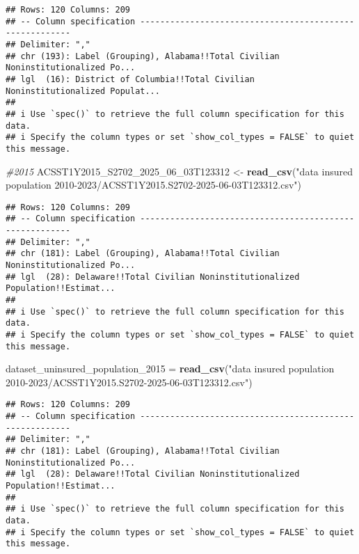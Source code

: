 \documentclass[
]{article}
\newenvironment{Shaded}{\begin{snugshade}}{\end{snugshade}}
\newcommand{\CommentTok}[1]{\textcolor[rgb]{0.56,0.35,0.01}{\textit{#1}}}
\newcommand{\FunctionTok}[1]{\textcolor[rgb]{0.13,0.29,0.53}{\textbf{#1}}}
\newcommand{\NormalTok}[1]{#1}
\newcommand{\OtherTok}[1]{\textcolor[rgb]{0.56,0.35,0.01}{#1}}
\newcommand{\StringTok}[1]{\textcolor[rgb]{0.31,0.60,0.02}{#1}}
\begin{document}
\begin{verbatim}
## Rows: 120 Columns: 209
## -- Column specification --------------------------------------------------------
## Delimiter: ","
## chr (193): Label (Grouping), Alabama!!Total Civilian Noninstitutionalized Po...
## lgl  (16): District of Columbia!!Total Civilian Noninstitutionalized Populat...
## 
## i Use `spec()` to retrieve the full column specification for this data.
## i Specify the column types or set `show_col_types = FALSE` to quiet this message.
\end{verbatim}

\begin{Shaded}
\begin{Highlighting}[]
\CommentTok{\#2015}
\NormalTok{ACSST1Y2015\_S2702\_2025\_06\_03T123312 }\OtherTok{\textless{}{-}} \FunctionTok{read\_csv}\NormalTok{(}\StringTok{"data insured population 2010{-}2023/ACSST1Y2015.S2702{-}2025{-}06{-}03T123312.csv"}\NormalTok{)}
\end{Highlighting}
\end{Shaded}

\begin{verbatim}
## Rows: 120 Columns: 209
## -- Column specification --------------------------------------------------------
## Delimiter: ","
## chr (181): Label (Grouping), Alabama!!Total Civilian Noninstitutionalized Po...
## lgl  (28): Delaware!!Total Civilian Noninstitutionalized Population!!Estimat...
## 
## i Use `spec()` to retrieve the full column specification for this data.
## i Specify the column types or set `show_col_types = FALSE` to quiet this message.
\end{verbatim}

\begin{Shaded}
\begin{Highlighting}[]
\NormalTok{dataset\_uninsured\_population\_2015 }\OtherTok{=} \FunctionTok{read\_csv}\NormalTok{(}\StringTok{"data insured population 2010{-}2023/ACSST1Y2015.S2702{-}2025{-}06{-}03T123312.csv"}\NormalTok{)}
\end{Highlighting}
\end{Shaded}

\begin{verbatim}
## Rows: 120 Columns: 209
## -- Column specification --------------------------------------------------------
## Delimiter: ","
## chr (181): Label (Grouping), Alabama!!Total Civilian Noninstitutionalized Po...
## lgl  (28): Delaware!!Total Civilian Noninstitutionalized Population!!Estimat...
## 
## i Use `spec()` to retrieve the full column specification for this data.
## i Specify the column types or set `show_col_types = FALSE` to quiet this message.
\end{verbatim}
\end{document}
